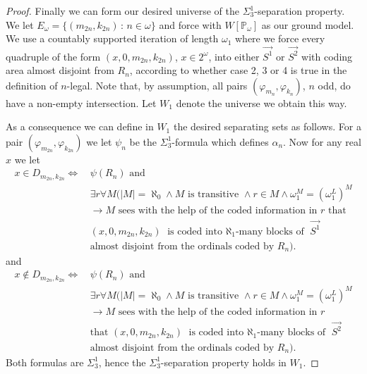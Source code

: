 \documentclass[a4paper,11pt]{article}
\newcommand{\forceP}{\mathbb{P}}
\begin{document}
\begin{proof}
Finally we can form our desired universe of the $\Sigma^1_3$-separation property. We let $E_{\omega} = \{(m_{2n},k_{2n}) \,: \, n \in \omega\}$ and force with $W[\forceP_{\omega}]$ as our ground model.  We use a countably supported iteration of length $\omega_1$ where we force every quadruple of the form $(x,0,m_{2n},k_{2n})$, $x \in 2^{\omega}$, into either $\vec{S^1}$ or $\vec{S^2}$ with coding area almost disjoint from $ R_{n}$, according to whether case 2, 3 or 4 is true in the definition of $n$-legal. Note that, by assumption, all pairs $(\varphi_{m_n}, \varphi_{k_n})$, $n$ odd, do have a non-empty intersection.  Let $W_1$ denote the universe we obtain this way.

As a consequence we can define in $W_1$ the desired separating sets as follows.
For a pair $(\varphi_{m_{2n}},\varphi_{k_{2n}})$ we let $\psi_{n}$ be the $\Sigma^1_3$-formula which defines $\alpha_{n}$. Now for any real $x$  we let 
\begin{align*}
x \in D_{m_{2n},k_{2n}} \Leftrightarrow \, &\psi(R_{n}) \text{ and } \\& \exists r \forall M (|M|=\aleph_0 \land M \text{ is transitive } \land r \in M \land \omega_1^M=(\omega_1^L)^M  \\&\rightarrow M \text{ sees with the help of the coded information in } r \text{ that }\\& (x,0,m_{2n},k_{2n})  \text{ is coded into $\aleph_1$-many blocks of } \vec{S^1} \\& \text{almost disjoint from the ordinals coded by }  R_{n}).
\end{align*}
and
\begin{align*}
x \notin D_{m_{2n},k_{2n}} \Leftrightarrow \, &\psi(R_{n}) \text{ and } \\& \exists r \forall M (|M|=\aleph_0 \land M \text{ is transitive } \land r \in M \land \omega_1^M=(\omega_1^L)^M  \\&\rightarrow M \text{ sees with the help of the coded information in } r \\& \text{that } (x,0,m_{2n},k_{2n})  \text{ is coded into $\aleph_1$-many blocks of } \vec{S^2} \\&\text{almost disjoint from the ordinals coded by }  R_{n}).
\end{align*}
Both formulas are $\Sigma^1_3$, hence the $\Sigma^1_3$-separation property holds in $W_1$.

\end{proof}
\end{document}
